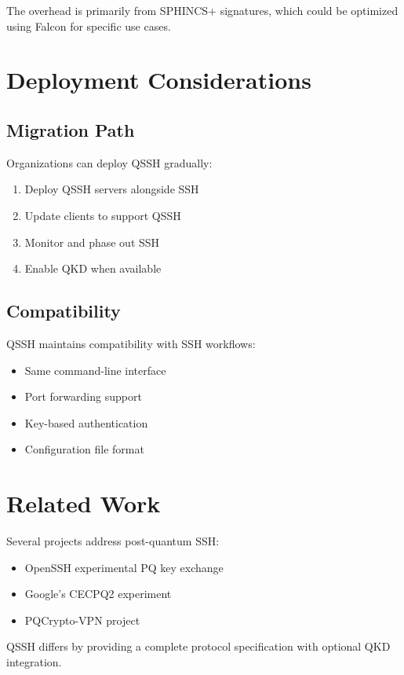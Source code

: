 \documentclass[11pt,a4paper]{article}
\begin{document}
The overhead is primarily from SPHINCS+ signatures, which could be optimized using Falcon for specific use cases.

\section{Deployment Considerations}

\subsection{Migration Path}

Organizations can deploy QSSH gradually:
\begin{enumerate}
    \item Deploy QSSH servers alongside SSH
    \item Update clients to support QSSH
    \item Monitor and phase out SSH
    \item Enable QKD when available
\end{enumerate}

\subsection{Compatibility}

QSSH maintains compatibility with SSH workflows:
\begin{itemize}
    \item Same command-line interface
    \item Port forwarding support
    \item Key-based authentication
    \item Configuration file format
\end{itemize}

\section{Related Work}

Several projects address post-quantum SSH:
\begin{itemize}
    \item OpenSSH experimental PQ key exchange
    \item Google's CECPQ2 experiment
    \item PQCrypto-VPN project
\end{itemize}

QSSH differs by providing a complete protocol specification with optional QKD integration.
\end{document}
